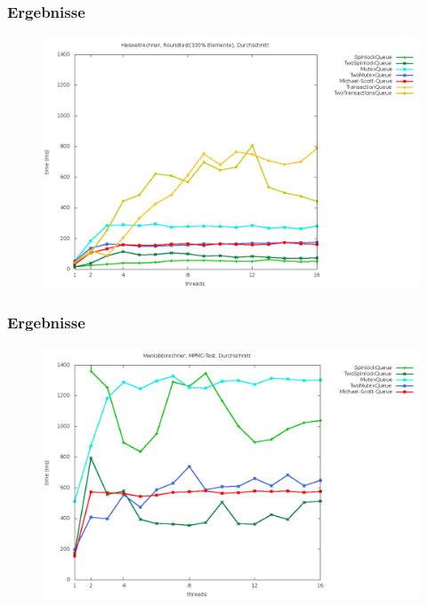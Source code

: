 \documentclass[svgnames]{beamer}
\begin{document}
\begin{frame}
\frametitle{Ergebnisse}
\begin {figure}
      \begin{center}
	\includegraphics[width=\textwidth]{fastboxr2a.png}
     \end{center}
\end {figure}
\end{frame}

\begin{frame}
\frametitle{Ergebnisse}
\begin {figure}
      \begin{center}
	\includegraphics[width=\textwidth]{manma.png}
     \end{center}
\end {figure}
\end{frame}
\end{document}

